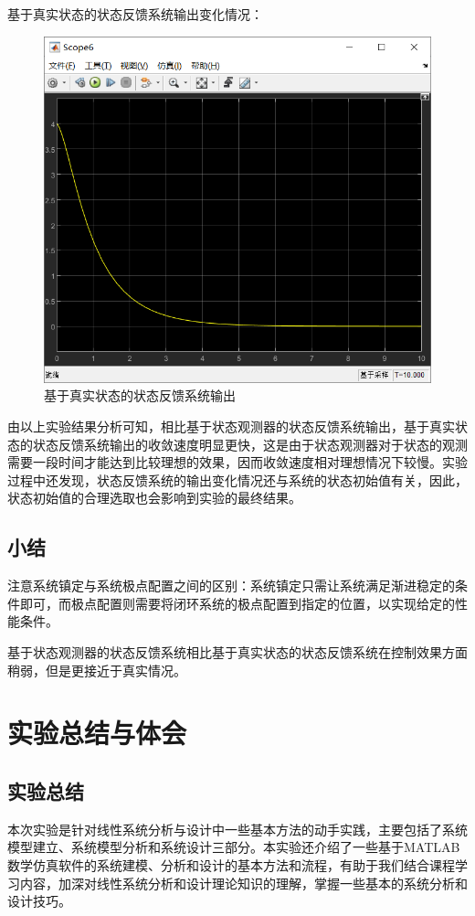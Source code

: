 \documentclass[UTF8]{article}
\begin{document}
\noindent 基于真实状态的状态反馈系统输出变化情况：
\begin{figure}[H]
    \centering %
    \includegraphics[width=.8\textwidth]{figure/exp3_3_基于真实状态的状态反馈_输出.png} 
    \caption{基于真实状态的状态反馈系统输出} %
\end{figure}

由以上实验结果分析可知，相比基于状态观测器的状态反馈系统输出，基于真实状态的状态反馈系统输出的收敛速度明显更快，这是由于状态观测器对于状态的观测需要一段时间才能达到比较理想的效果，因而收敛速度相对理想情况下较慢。实验过程中还发现，状态反馈系统的输出变化情况还与系统的状态初始值有关，因此，状态初始值的合理选取也会影响到实验的最终结果。

\subsection{小结}
注意系统镇定与系统极点配置之间的区别：系统镇定只需让系统满足渐进稳定的条件即可，而极点配置则需要将闭环系统的极点配置到指定的位置，以实现给定的性能条件。

基于状态观测器的状态反馈系统相比基于真实状态的状态反馈系统在控制效果方面稍弱，但是更接近于真实情况。

%
\section{实验总结与体会}
\subsection{实验总结}
本次实验是针对线性系统分析与设计中一些基本方法的动手实践，主要包括了系统模型建立、系统模型分析和系统设计三部分。本实验还介绍了一些基于MATLAB数学仿真软件的系统建模、分析和设计的基本方法和流程，有助于我们结合课程学习内容，加深对线性系统分析和设计理论知识的理解，掌握一些基本的系统分析和设计技巧。
\end{document}
